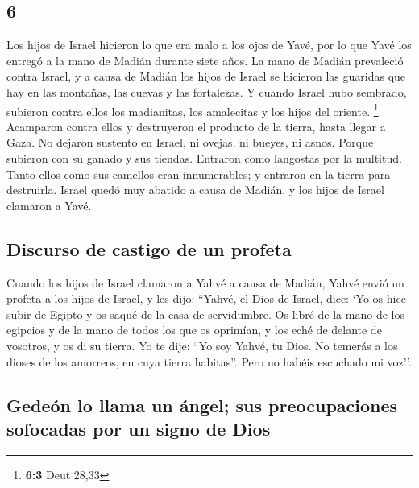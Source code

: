 \begin{paracol}{2}
\hypertarget{section-10}{%
\section{6}\label{section-10}}

 Los hijos de Israel hicieron lo que era malo a los ojos
de Yavé, por lo que Yavé los entregó a la mano de Madián durante siete
años.  La mano de Madián prevaleció contra Israel, y a
causa de Madián los hijos de Israel se hicieron las guaridas que hay en
las montañas, las cuevas y las fortalezas.  Y cuando
Israel hubo sembrado, subieron contra ellos los madianitas, los
amalecitas y los hijos del oriente. \footnote{\textbf{6:3} Deut 28,33}
 Acamparon contra ellos y destruyeron el producto de la
tierra, hasta llegar a Gaza. No dejaron sustento en Israel, ni ovejas,
ni bueyes, ni asnos.  Porque subieron con su ganado y sus
tiendas. Entraron como langostas por la multitud. Tanto ellos como sus
camellos eran innumerables; y entraron en la tierra para destruirla.
 Israel quedó muy abatido a causa de Madián, y los hijos
de Israel clamaron a Yavé.

\hypertarget{discurso-de-castigo-de-un-profeta}{%
\subsection{Discurso de castigo de un
profeta}\label{discurso-de-castigo-de-un-profeta}}

 Cuando los hijos de Israel clamaron a Yahvé a causa de
Madián,  Yahvé envió un profeta a los hijos de Israel, y
les dijo: ``Yahvé, el Dios de Israel, dice: `Yo os hice subir de Egipto
y os saqué de la casa de servidumbre.  Os libré de la mano
de los egipcios y de la mano de todos los que os oprimían, y los eché de
delante de vosotros, y os di su tierra.  Yo te dije: ``Yo
soy Yahvé, tu Dios. No temerás a los dioses de los amorreos, en cuya
tierra habitas''. Pero no habéis escuchado mi voz''.

\hypertarget{gedeuxf3n-lo-llama-un-uxe1ngel-sus-preocupaciones-sofocadas-por-un-signo-de-dios}{%
\subsection{Gedeón lo llama un ángel; sus preocupaciones sofocadas por
un signo de
Dios}\label{gedeuxf3n-lo-llama-un-uxe1ngel-sus-preocupaciones-sofocadas-por-un-signo-de-dios}}


\end{paracol}

